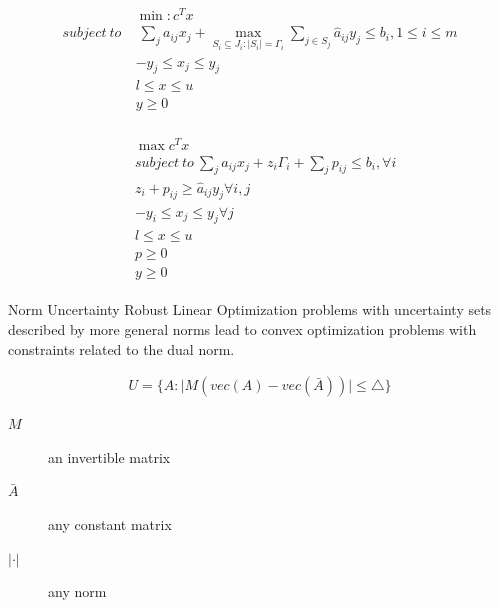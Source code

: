 \documentclass{beamer}
\begin{document}
\begin{frame}{}
\begin{align*}
\begin{split}
& \min : c^Tx \\
subject~to~&~\sum_ja_{ij}x_{j} + \max_{S_i\subseteq J_i:|S_i|=\Gamma_i} \sum_{j \in S_j}\hat{a}_{ij}y_j \leq b_i, 1 \leq i \leq m \\
& -y_j \leq x_j \leq y_j \\
& l \leq x \leq u \\
& y \geq 0
\end{split}
\end{align*}

\begin{align*}
\begin{split}
& \max c^Tx \\
& subject~to~\sum_{j}a_{ij}x_{j} + z_{i}\Gamma_{i} + \sum_{j}p_{ij} \leq b_i, \forall i \\
& z_i + p_{ij} \geq \hat{a}_{ij}y_{j} \forall i,j \\
& -y_i \leq x_j \leq y_j \forall j \\
& l \leq x \leq u \\
& p \geq 0 \\
& y \geq 0
\end{split}
\end{align*}
\end{frame}

\begin{frame}{Norm Uncertainty}
Robust Linear Optimization problems with uncertainty sets described by more general norms lead to convex optimization problems with constraints related to the dual norm.

\begin{align*}
U = \{A : \lvert M(vec(A) - vec(\bar{A})) \rvert \leq \triangle\}
\end{align*}
\begin{description}
\item [$M$] an invertible matrix
\item [$\bar{A}$] any constant matrix
\item [$\lvert \cdot \rvert$] any norm
\end{description}
\end{frame}
\end{document}
